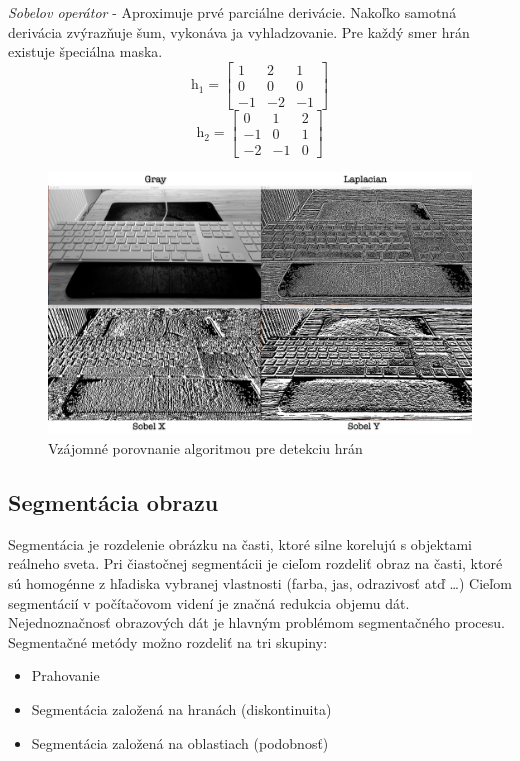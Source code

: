 \textit{Sobelov operátor} - Aproximuje prvé parciálne derivácie. Nakoľko samotná derivácia zvýrazňuje šum, vykonáva ja vyhladzovanie. Pre každý smer hrán existuje špeciálna maska.
$$\textit{h}_1=\begin{bmatrix} 1 & 2 & 1 \\ 0 & 0 & 0 \\ -1 & -2 & -1  \end{bmatrix}$$
$$\textit{h}_2=\begin{bmatrix} 0 & 1 & 2 \\ -1 & 0 & 1 \\ -2 & -1 & 0  \end{bmatrix}$$

\begin{figure}[H]
\begin{center}
	\includegraphics[scale=0.16]{obrazky/hranove_filtre}
	\caption{Vzájomné porovnanie algoritmou pre detekciu hrán}
	\end{center}
\end{figure}


\subsection{Segmentácia obrazu}
Segmentácia je rozdelenie obrázku na časti, ktoré silne korelujú s objektami reálneho sveta. Pri čiastočnej segmentácii je cieľom rozdeliť obraz na časti, ktoré sú homogénne z hľadiska vybranej vlastnosti (farba, jas, odrazivosť atď …) Cieľom segmentácií v počítačovom videní je značná redukcia objemu dát. Nejednoznačnosť obrazových dát je hlavným problémom segmentačného procesu. Segmentačné metódy možno rozdeliť na tri skupiny: 


\begin{itemize}
\item Prahovanie
\item Segmentácia založená na hranách (diskontinuita)
\item Segmentácia založená na oblastiach (podobnosť)
\end{itemize}

